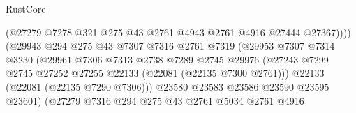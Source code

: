 \begin{lexlean}{RustCore}
\begin{coremodule}
                                          (@27279
                                            @7278
                                            @321
                                            @275
                                            @43
                                            @2761
                                            @4943
                                            @2761
                                            @4916
                                            @27444
                                            @27367))))
                                    (@29943
                                      @294
                                      @275
                                      @43
                                      @7307
                                      @7316
                                      @2761
                                      @7319
                                      (@29953
                                        @7307
                                        @7314
                                        @3230
                                        (@29961
                                          @7306
                                          @7313
                                          @2738
                                          @7289
                                          @2745
                                          @29976
                                          (@27243
                                            @7299
                                            @2745
                                            @27252
                                            @27255
                                            @22133
                                            (@22081 (@22135 @7300 @2761)))
                                          @22133
                                          (@22081 (@22135 @7290 @7306)))
                                        @23580
                                        @23583
                                        @23586
                                        @23590
                                        @23595
                                        @23601)
                                      (@27279
                                        @7316
                                        @294
                                        @275
                                        @43
                                        @2761
                                        @5034
                                        @2761
                                        @4916

\end{coremodule}
\end{lexlean}

